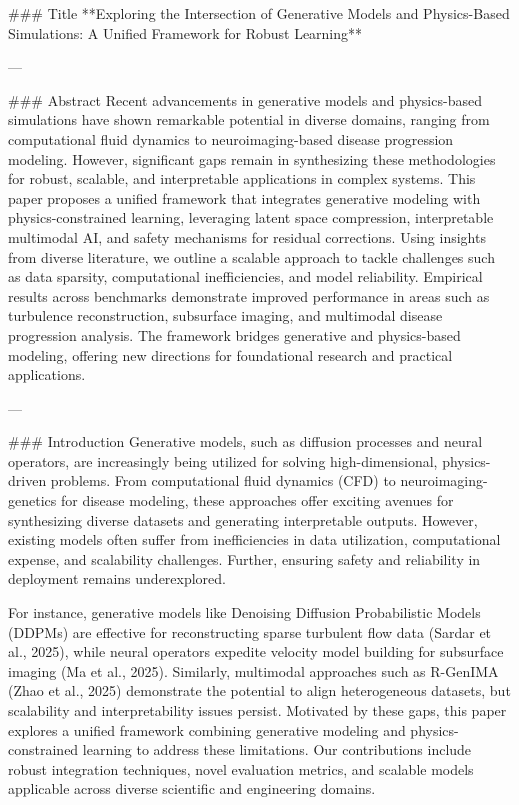 ### Title  
**Exploring the Intersection of Generative Models and Physics-Based Simulations: A Unified Framework for Robust Learning**

---

### Abstract  
Recent advancements in generative models and physics-based simulations have shown remarkable potential in diverse domains, ranging from computational fluid dynamics to neuroimaging-based disease progression modeling. However, significant gaps remain in synthesizing these methodologies for robust, scalable, and interpretable applications in complex systems. This paper proposes a unified framework that integrates generative modeling with physics-constrained learning, leveraging latent space compression, interpretable multimodal AI, and safety mechanisms for residual corrections. Using insights from diverse literature, we outline a scalable approach to tackle challenges such as data sparsity, computational inefficiencies, and model reliability. Empirical results across benchmarks demonstrate improved performance in areas such as turbulence reconstruction, subsurface imaging, and multimodal disease progression analysis. The framework bridges generative and physics-based modeling, offering new directions for foundational research and practical applications.

---

### Introduction  
Generative models, such as diffusion processes and neural operators, are increasingly being utilized for solving high-dimensional, physics-driven problems. From computational fluid dynamics (CFD) to neuroimaging-genetics for disease modeling, these approaches offer exciting avenues for synthesizing diverse datasets and generating interpretable outputs. However, existing models often suffer from inefficiencies in data utilization, computational expense, and scalability challenges. Further, ensuring safety and reliability in deployment remains underexplored.

For instance, generative models like Denoising Diffusion Probabilistic Models (DDPMs) are effective for reconstructing sparse turbulent flow data (Sardar et al., 2025), while neural operators expedite velocity model building for subsurface imaging (Ma et al., 2025). Similarly, multimodal approaches such as R-GenIMA (Zhao et al., 2025) demonstrate the potential to align heterogeneous datasets, but scalability and interpretability issues persist. Motivated by these gaps, this paper explores a unified framework combining generative modeling and physics-constrained learning to address these limitations. Our contributions include robust integration techniques, novel evaluation metrics, and scalable models applicable across diverse scientific and engineering domains.

